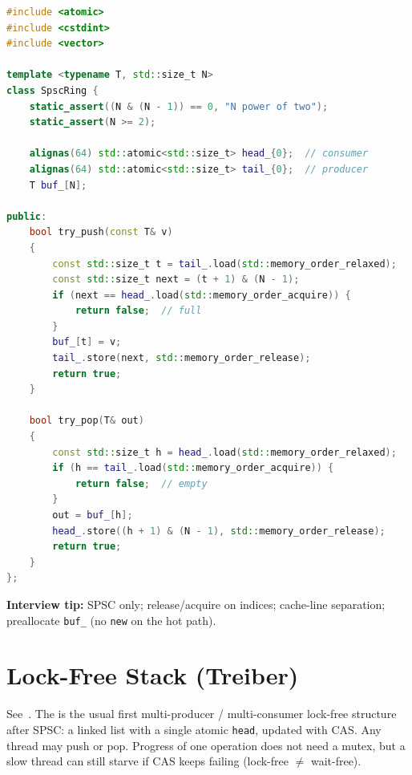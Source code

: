 \begin{lstlisting}[language=C++]
#include <atomic>
#include <cstdint>
#include <vector>

template <typename T, std::size_t N>
class SpscRing {
    static_assert((N & (N - 1)) == 0, "N power of two");
    static_assert(N >= 2);

    alignas(64) std::atomic<std::size_t> head_{0};  // consumer
    alignas(64) std::atomic<std::size_t> tail_{0};  // producer
    T buf_[N];

public:
    bool try_push(const T& v)
    {
        const std::size_t t = tail_.load(std::memory_order_relaxed);
        const std::size_t next = (t + 1) & (N - 1);
        if (next == head_.load(std::memory_order_acquire)) {
            return false;  // full
        }
        buf_[t] = v;
        tail_.store(next, std::memory_order_release);
        return true;
    }

    bool try_pop(T& out)
    {
        const std::size_t h = head_.load(std::memory_order_relaxed);
        if (h == tail_.load(std::memory_order_acquire)) {
            return false;  // empty
        }
        out = buf_[h];
        head_.store((h + 1) & (N - 1), std::memory_order_release);
        return true;
    }
};
\end{lstlisting}

\par\noindent\textbf{Interview tip:} SPSC only; release/acquire on indices; cache-line separation; 
preallocate \texttt{buf\_} (no \texttt{new} on the hot path).

\section{Lock-Free Stack (Treiber)}
\label{sec:treiber-stack}
See~\cite{wiki-treiber-stack}. The  is the usual first 
multi-producer / multi-consumer lock-free structure after SPSC: a linked list with a 
single atomic \texttt{head}, updated with CAS.
\newline
Any thread may push or pop. Progress of one operation does not need a mutex, but a 
slow thread can still starve if CAS keeps failing (lock-free $\neq$ wait-free).

